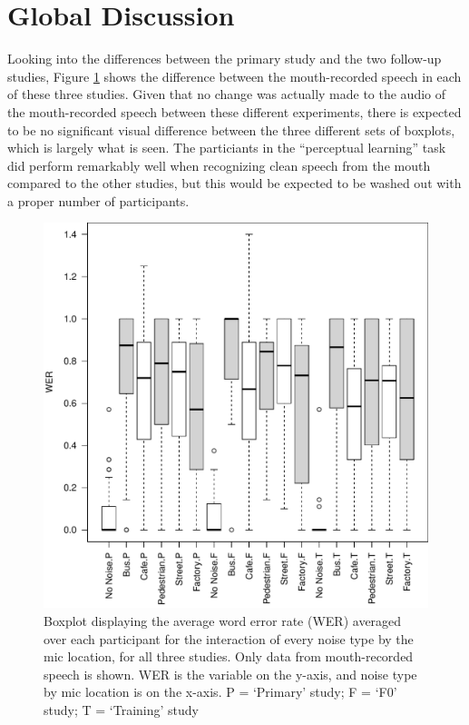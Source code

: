 \documentclass[dissertation,copyright]{uathesis}
\makeatletter
\def\maxwidth{ %
  \ifdim\Gin@nat@width>\linewidth
    \linewidth
  \else
    \Gin@nat@width
  \fi
}
\makeatother
\begin{document}
\section{Global Discussion}
\label{ch4:glob_discussion}

Looking into the differences between the primary study and the two follow-up studies, Figure \ref{fig:ALLXperc_noiseXmic_mouth_boxplot} shows the difference between the mouth-recorded speech in each of these three studies.  Given that no change was actually made to the audio of the mouth-recorded speech between these different experiments, there is expected to be no significant visual difference between the three different sets of boxplots, which is largely what is seen.  The particiants in the ``perceptual learning'' task did perform remarkably well when recognizing clean speech from the mouth compared to the other studies, but this would be expected to be washed out with a proper number of participants.

\begin{figure}[h!]

\includegraphics[width=\maxwidth]{figure/boxplot_noiseXmicXall_mouth-1} 

\caption{Boxplot displaying the average word error rate (WER) averaged over each participant for the interaction of every noise type by the mic location, for all three studies. Only data from mouth-recorded speech is shown. WER is the variable on the y-axis, and noise type by mic location is on the x-axis. P = `Primary' study; F = `F0' study; T = `Training' study}
\label{fig:ALLXperc_noiseXmic_mouth_boxplot}
\end{figure}
\end{document}
